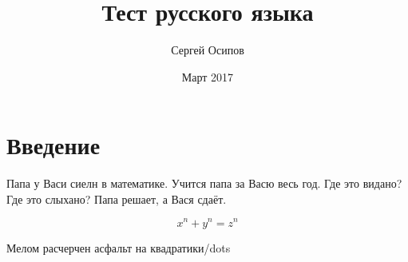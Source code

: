 \documentclass{article}
\title{Тест русского языка}
\author{Сергей Осипов}
\date{Март 2017}
\begin{document}
\maketitle

\section{Введение}

Папа у Васи сиелн в математике. Учится папа за Васю весь год. Где это видано? Где это слыхано? Папа решает, а Вася сдаёт.

\begin{equation} 
\label{e:1}
x^n + y^n = z^n 
\end{equation}

Мелом расчерчен асфальт на квадратики/dots
\end{document}
